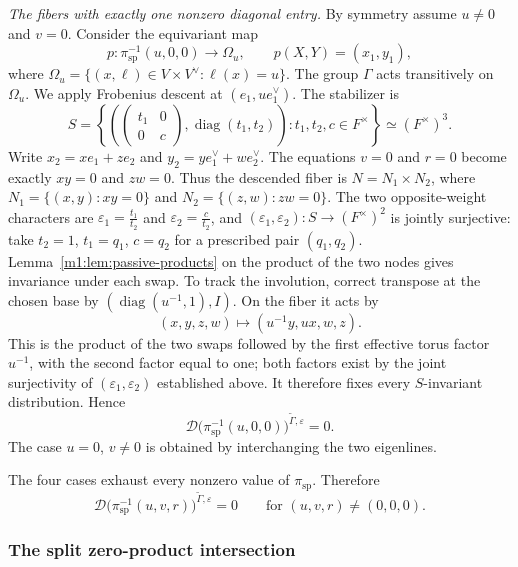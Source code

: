 \emph{The fibers with exactly one nonzero diagonal entry.}
By symmetry assume $u\neq0$ and $v=0$.  Consider the equivariant map
\[
    p:\pi_{\mathrm{sp}}^{-1}(u,0,0)
    \longrightarrow
    \Omega_u,
    \qquad
    p(X,Y)=(x_1,y_1),
\]
where \(\Omega_u=\{(x,\ell)\in V\times V^\vee:\ell(x)=u\}\). The group $\Gamma$ acts transitively on
$\Omega_u$. We apply Frobenius descent at
$(e_1,ue_1^\vee)$. The stabilizer is
\[
    S=
    \left\{
    \left(
        \begin{pmatrix}t_1&0\\0&c\end{pmatrix},
        \operatorname{diag}(t_1,t_2)
    \right):
    t_1,t_2,c\in F^\times
    \right\}
    \simeq(F^\times)^3.
\]
Write \(x_2=xe_1+ze_2\) and \(y_2=ye_1^\vee+we_2^\vee\). The equations $v=0$ and $r=0$ become
exactly \(xy=0\) and \(zw=0\). Thus the descended fiber is \(N=N_1\times N_2\), where
\(N_1=\{(x,y):xy=0\}\) and \(N_2=\{(z,w):zw=0\}\). The two opposite-weight characters are
\(\varepsilon_1=\frac{t_1}{t_2}\) and \(\varepsilon_2=\frac{c}{t_2}\), and
\((\varepsilon_1,\varepsilon_2):S\longrightarrow(F^\times)^2\) is jointly surjective: take $t_2=1$, $t_1=q_1$, $c=q_2$ for a
prescribed pair $(q_1,q_2)$. Lemma~\ref{m1:lem:passive-products} on the
product of the two nodes gives invariance under each swap.
To track the involution, correct transpose at the chosen base by
$(\operatorname{diag}(u^{-1},1),I)$. On the fiber it acts by
\[
 (x,y,z,w)\longmapsto(u^{-1}y,ux,w,z).
\]
This is the product of the two swaps followed by the first effective
torus factor $u^{-1}$, with the second factor equal to one; both factors exist by the joint surjectivity of
$(\varepsilon_1,\varepsilon_2)$ established above. It therefore fixes every
$S$-invariant distribution. Hence
\[
    \mathcal D\bigl(\pi_{\mathrm{sp}}^{-1}(u,0,0)\bigr)^{\widetilde \Gamma,\varepsilon}=0.
\]
The case $u=0$, $v\neq0$ is obtained by interchanging the two eigenlines.

The four cases exhaust every nonzero value of $\pi_{\mathrm{sp}}$.  Therefore
\begin{equation}\label{m1:eq:split-nonzero-fibers}
    \mathcal D\bigl(\pi_{\mathrm{sp}}^{-1}(u,v,r)\bigr)^{\widetilde \Gamma,\varepsilon}=0
    \qquad
    \text{for }(u,v,r)\neq(0,0,0).
\end{equation}

\subsubsection{The split zero-product intersection}\label{m1:subsec:split-zero-intersection}

